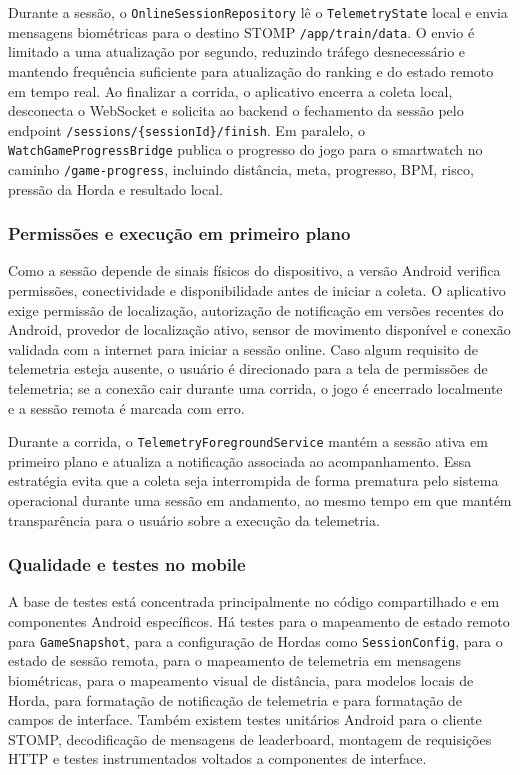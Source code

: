 Durante a sessão, o \texttt{OnlineSessionRepository} lê o \texttt{TelemetryState} local e envia mensagens biométricas para o destino STOMP \texttt{/app/train/data}. O envio é limitado a uma atualização por segundo, reduzindo tráfego desnecessário e mantendo frequência suficiente para atualização do ranking e do estado remoto em tempo real. Ao finalizar a corrida, o aplicativo encerra a coleta local, desconecta o WebSocket e solicita ao backend o fechamento da sessão pelo endpoint \texttt{/sessions/\{sessionId\}/finish}. Em paralelo, o \texttt{WatchGameProgressBridge} publica o progresso do jogo para o smartwatch no caminho \texttt{/game-progress}, incluindo distância, meta, progresso, BPM, risco, pressão da Horda e resultado local.

\vspace{0.2cm}
\subsubsection{Permissões e execução em primeiro plano}
\vspace{0.2cm}

Como a sessão depende de sinais físicos do dispositivo, a versão Android verifica permissões, conectividade e disponibilidade antes de iniciar a coleta. O aplicativo exige permissão de localização, autorização de notificação em versões recentes do Android, provedor de localização ativo, sensor de movimento disponível e conexão validada com a internet para iniciar a sessão online. Caso algum requisito de telemetria esteja ausente, o usuário é direcionado para a tela de permissões de telemetria; se a conexão cair durante uma corrida, o jogo é encerrado localmente e a sessão remota é marcada com erro.

Durante a corrida, o \texttt{TelemetryForegroundService} mantém a sessão ativa em primeiro plano e atualiza a notificação associada ao acompanhamento. Essa estratégia evita que a coleta seja interrompida de forma prematura pelo sistema operacional durante uma sessão em andamento, ao mesmo tempo em que mantém transparência para o usuário sobre a execução da telemetria.

\vspace{0.2cm}
\subsubsection{Qualidade e testes no mobile}
\vspace{0.2cm}

A base de testes está concentrada principalmente no código compartilhado e em componentes Android específicos. Há testes para o mapeamento de estado remoto para \texttt{GameSnapshot}, para a configuração de Hordas como \texttt{SessionConfig}, para o estado de sessão remota, para o mapeamento de telemetria em mensagens biométricas, para o mapeamento visual de distância, para modelos locais de Horda, para formatação de notificação de telemetria e para formatação de campos de interface. Também existem testes unitários Android para o cliente STOMP, decodificação de mensagens de leaderboard, montagem de requisições HTTP e testes instrumentados voltados a componentes de interface.

